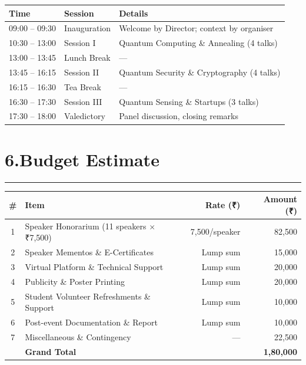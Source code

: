 \documentclass[12pt,a4paper]{article}
\begin{document}
\begin{table}[h!]
\centering
\begin{tabularx}{\textwidth}{l l X}
  \toprule
  \textbf{Time} & \textbf{Session} & \textbf{Details} \\
  \midrule
  09:00 -- 09:30 & Inauguration       & Welcome by Director; context by organiser \\
  10:30 -- 13:00 & Session I           & Quantum Computing \& Annealing (4 talks) \\
  13:00 -- 13:45 & Lunch Break         & --- \\
  13:45 -- 16:15 & Session II          & Quantum Security \& Cryptography (4 talks) \\
  16:15 -- 16:30 & Tea Break           & --- \\
  16:30 -- 17:30 & Session III         & Quantum Sensing \& Startups (3 talks)\\
  17:30 -- 18:00 & Valedictory         & Panel discussion, closing remarks \\
  \bottomrule
\end{tabularx}
\end{table}

\section*{6.\quad Budget Estimate}
\vspace{-4pt}\hrule\vspace{6pt}

\begin{table}[h!]
\centering
\begin{tabularx}{\textwidth}{c X r r}
  \toprule
  \textbf{\#} & \textbf{Item} & \textbf{Rate (\textrm{₹})} & \textbf{Amount (\textrm{₹})} \\
  \midrule
  1 & Speaker Honorarium (11 speakers $\times$ \textrm{₹}7,500) & 7,500/speaker & 82,500 \\
  2 & Speaker Mementos \& E-Certificates & Lump sum & 15,000 \\
  3 & Virtual Platform \& Technical Support & Lump sum & 20,000 \\
  4 & Publicity \& Poster Printing & Lump sum & 20,000 \\
  5 & Student Volunteer Refreshments \& Support & Lump sum & 10,000 \\
  6 & Post-event Documentation \& Report & Lump sum & 10,000 \\
  7 & Miscellaneous \& Contingency & --- & 22,500 \\
  \midrule
  & \textbf{Grand Total} & & \textbf{1,80,000} \\
  \bottomrule
\end{tabularx}
\end{table}
\end{document}
